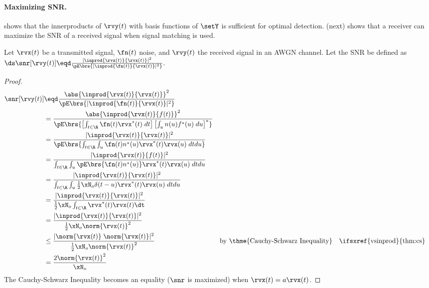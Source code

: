 \paragraph{Maximizing SNR.}
 shows that the innerproducts of $\rvy(t)$ with
basis functions of $\setY$ is sufficient for optimal detection.
 (next) shows that a receiver can
maximize the SNR of a received signal when signal matching is used.

\begin{theorem}
\label{thm:mf_maxSNR}
Let $\rvx(t)$ be a transmitted signal, $\fn(t)$ noise, and $\rvy(t)$ the received signal
in an AWGN channel.
Let the  SNR be defined as
\\\indentx$\ds
      \snr[\rvy(t)] \eqd \frac{|\inprod{\rvx(t)}{\rvx(t)}|^2}
                            {\pE\brs{|\inprod{\fn(t)}{\rvx(t)}|^2}}.
          $
\end{theorem}

\begin{proof}
\begin{align*}
   \snr[\rvy(t)]
     &\eqd \frac{\abs{\inprod{\rvx(t)}{\rvx(t)}}^2}
                {\pE\brs{|\inprod{\fn(t)}{\rvx(t)}|^2}}
   \\&=    \frac{\abs{\inprod{\rvx(t)}{f(t)}}^2}
                {\pE\brs{\left[\int_{t\in\R} \fn(t)\rvx^\ast(t)\;dt\right]
                      \left[\int_u n(u)f^\ast(u)\;du\right]^\ast}
                }
   \\&=    \frac{|\inprod{\rvx(t)}{\rvx(t)}|^2}
                {\pE\brs{\int_{t\in\R} \int_u \fn(t)n^\ast(u)\rvx^\ast(t)\rvx(u)\;dtdu}}
   \\&=    \frac{|\inprod{\rvx(t)}{f(t)}|^2}
                {\int_{t\in\R} \int_u \pE\brs{\fn(t)n^\ast(u)}\rvx^\ast(t)\rvx(u)\;dtdu}
   \\&=    \frac{|\inprod{\rvx(t)}{\rvx(t)}|^2}
                {\int_{t\in\R} \int_u \frac{1}{2}\xN_o\delta(t-u) \rvx^\ast(t)\rvx(u)\;dtdu}
   \\&=    \frac{|\inprod{\rvx(t)}{\rvx(t)}|^2}
                {\frac{1}{2}\xN_o \int_{t\in\R} \rvx^\ast(t)\rvx(t)\dt}
   \\&=    \frac{|\inprod{\rvx(t)}{\rvx(t)}|^2}
                {\frac{1}{2}\xN_o \norm{\rvx(t)}^2}
   \\&\le  \frac{|\norm{\rvx(t)}\;\norm{\rvx(t)}|^2}
                {\frac{1}{2}\xN_o \norm{\rvx(t)}^2}
     &&    \text{by \thme{Cauchy-Schwarz Inequality}}
     &&    \text{\ifsxref{vsinprod}{thm:cs}}
   \\&=    \frac{2\norm{\rvx(t)}^2}
                {\xN_o }
\end{align*}
The Cauchy-Schwarz Inequality becomes an equality
($\snr$ is maximized) when $\rvx(t)=a\rvx(t)$.
\end{proof}

